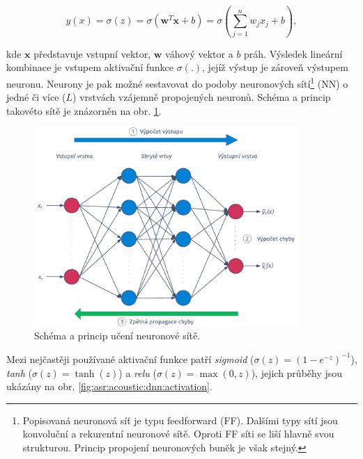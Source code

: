 \begin{equation}
  y\left(x\right) = \sigma\left(z\right) = \sigma \left(\boldsymbol{w}^{T}\boldsymbol{x} + b\right) = \sigma \left( \sum_{j=1}^{n} w_{j}x_{j} + b\right),
   \label{eq:asr:acoustic:dnn:neuron:output}
 \end{equation}

\noindent kde $\boldsymbol{x}$ představuje vstupní vektor, $\boldsymbol{w}$ váhový vektor a $b$ práh. Výsledek lineární kombinace je vstupem aktivační funkce $\sigma\left(.\right)$, jejíž výstup je zároveň výstupem neuronu. Neurony je pak možné sestavovat do podoby neuronových sítí\footnote{Popisovaná neuronová síť je typu feedforward (FF). Dalšími typy sítí jsou konvoluční a rekurentní neuronové sítě. Oproti FF síti se liší hlavně svou strukturou. Princip propojení neuronových buněk je však stejný.} (NN) o jedné či více ($L$) vrstvách vzájemně propojených neuronů. Schéma a princip takovéto sítě je znázorněn na obr. \ref{fig:asr:acoustic:dnn:training}.

\begin{figure}[hbpt]
  \centering
  \includegraphics[width=0.9\textwidth]{./parts/ch4-asr/img/dnn-training.pdf}
  \caption{Schéma a princip učení neuronové sítě.}
  \label{fig:asr:acoustic:dnn:training}
\end{figure}

Mezi nejčastěji používané aktivační funkce patří \textit{sigmoid} ($\sigma\left(z\right) = \left(1 - e^{-z}\right)^{-1}$), \textit{tanh} ($\sigma\left(z\right) = \tanh\left(z\right)$) a \textit{relu} ($\sigma\left(z\right) = \max\left(0, z\right)$), jejich průběhy jsou ukázány na obr. \ref{fig:asr:acoustic:dnn:activation}.

